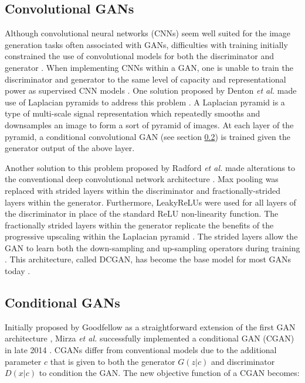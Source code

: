 \documentclass[11pt]{article}
\begin{document}
\subsection{Convolutional GANs}
Although convolutional neural networks (CNNs) seem well suited for the image generation tasks often associated with GANs, difficulties with training initially constrained the use of convolutional models for both the discriminator and generator \citep{2017arXiv171007035C}. When implementing CNNs within a GAN, one is unable to train the discriminator and generator to the same level of capacity and representational power as supervised CNN models \citep{2017arXiv171007035C}. One solution proposed by Denton \textit{et al.} made use of Laplacian pyramids to address this problem \citep{2015arXiv150605751D}. A Laplacian pyramid is a type of multi-scale signal representation which repeatedly smooths and downsamples an image to form a sort of pyramid of images. At each layer of the pyramid, a conditional convolutional GAN (see section \ref{sec:condgan}) is trained given the generator output of the above layer.

Another solution to this problem proposed by Radford \textit{et al.} made alterations to the conventional deep convolutional network architecture \citep{2015arXiv151106434R}. Max pooling was replaced with strided layers within the discriminator and fractionally-strided layers within the generator. Furthermore, LeakyReLUs were used for all layers of the discriminator in place of the standard ReLU non-linearity function. The fractionally strided layers within the generator replicate the benefits of the progressive upscaling within the Laplacian pyramid \citep{2017arXiv171007035C}. The strided layers allow the GAN to learn both the down-sampling and up-sampling operators during training \citep{2017arXiv171007035C}. This architecture, called DCGAN, has become the base model for most GANs today \citep{2017arXiv170100160G}.

\subsection{Conditional GANs} \label{sec:condgan}
Initially proposed by Goodfellow as a straightforward extension of the first GAN architecture \citep{2014arXiv1406.2661G}, Mirza \textit{et al.} successfully implemented a conditional GAN (CGAN) in late 2014 \citep{2014arXiv1411.1784M}. CGANs differ from conventional models due to the additional parameter $c$ that is given to both the generator $G(z|c)$ and discriminator $D(x|c)$ to condition the GAN. The new objective function of a CGAN becomes:
\end{document}
